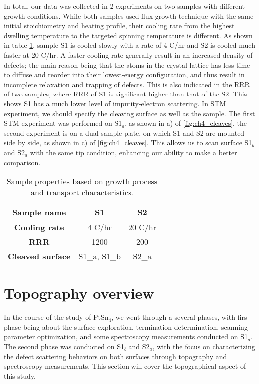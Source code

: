 \par In total, our data was collected in 2 experiments on two samples with different growth conditions. While both samples used flux growth technique with the same initial stoichiometry and heating profile, their cooling rate from the highest dwelling temperature to the targeted spinning temperature is different. As shown in table \ref{table:sample}, sample S1 is cooled slowly with a rate of 4 \degree C/hr and S2 is cooled much faster at 20 \degree C/hr. A faster cooling rate generally result in an increased density of defects; the main reason being that the atoms in the crystal lattice has less time to diffuse and reorder into their lowest-energy configuration, and thus result in incomplete relaxation and trapping of defects. This is also indicated in the \ac{RRR} of two samples, where \ac{RRR} of S1 is significant higher than that of the S2. This shows S1 has a much lower level of impurity-electron scattering.
In \ac{STM} experiment, we should specify the cleaving surface as well as the sample. The first \ac{STM} experiment was performed on S1$_a$, as shown in a) of \ref{fig:ch4_cleaves}, the second experiment is on a dual sample plate, on which S1 and S2 are mounted side by side, as shown in c) of \ref{fig:ch4_cleaves}. This allows us to scan surface S1$_b$ and S2$_a$ with the same tip condition, enhancing our ability to make a better comparison.

\begin{table}[h!]
	\centering
	\begin{tabular}{|c|c|c|}
		\hline
		\textbf{Sample name} & \textbf{S1} & \textbf{S2} \\ \hline
		\textbf{Cooling rate} & 4 \degree C/hr & 20 \degree C/hr \\ \hline
		\textbf{\ac{RRR}} & 1200 & 200 \\ \hline
		\textbf{Cleaved surface} & S1\_a, S1\_b & S2\_a \\ \hline
	\end{tabular}
	\caption{Sample properties based on growth process and transport characteristics.}
	\label{table:sample}
\end{table}

\section{Topography overview}
\par In the course of the study of PtSn$_4$, we went through a several phases, with firs phase being about the surface exploration, termination determination, scanning parameter optimization, and some spectroscopy measurements conducted on S1$_a$. The second phase was conducted on S1$_b$ and S2$_a$, with the focus on characterizing the defect scattering behaviors on both surfaces through topography and spectroscopy measurements. This section will cover the topographical aspect of this study. 

